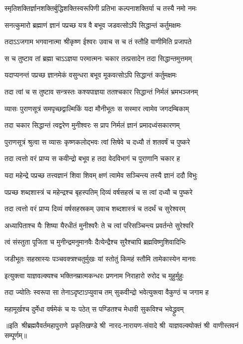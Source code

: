 \twolineshloka
{स्मृतिशक्तिर्ज्ञानशक्तिर्बुद्धिशक्तिस्वरूपिणी}
{प्रतिभा कल्पनाशक्तिर्या च तस्यै नमो नमः}%

\twolineshloka
{सनत्कुमारो ब्रह्माणं ज्ञानं पप्रच्छ यत्र वै}
{बभूव जडवत्सोऽपि सिद्धान्तं कर्तुमक्षमः}%

\twolineshloka
{तदाऽऽजगाम भगवानात्मा श्रीकृष्ण ईश्वरः}
{उवाच स च तं स्तौहि वाणीमिति प्रजापते}%

\twolineshloka
{स च तुष्टाव तां ब्रह्मा चाऽऽज्ञया परमात्मनः}
{चकार तत्प्रसादेन तदा सिद्धान्तमुत्तमम्}%

\twolineshloka
{यदाप्यनन्तं पप्रच्छ ज्ञानमेकं वसुन्धरा}
{बभूव मूकवत्सोऽपि सिद्धान्तं कर्तुमक्षमः}%

\twolineshloka
{तदा त्वां च स तुष्टाव सन्त्रस्तः कश्यपाज्ञया}
{ततश्चकार सिद्धान्तं निर्मलं भ्रमभञ्जनम्}%

\twolineshloka
{व्यासः पुराणसूत्रं समपृच्छद्वाल्मिकिं यदा}
{मौनीभूतः स सस्मार त्वामेव जगदम्बिकाम्}%

\twolineshloka
{तदा चकार सिद्धान्तं त्वद्वरेण मुनीश्वरः}
{स प्राप निर्मलं ज्ञानं प्रमादध्वंसकारणम्}%

\twolineshloka
{पुराणसूत्रं श्रुत्वा स व्यासः कृष्णकलोद्भवः}
{त्वां सिषेवे च दध्यौ तं शतवर्षं च पुष्करे}%

\twolineshloka
{तदा त्वत्तो वरं प्राप्य स कवीन्द्रो बभूव ह}
{तदा वेदविभागं च पुराणानि चकार ह}%

\twolineshloka
{यदा महेन्द्रे पप्रच्छ तत्त्वज्ञानं शिवा शिवम्}
{क्षणं त्वामेव सञ्चिन्त्य तस्यै ज्ञानं ददौ विभुः}%

\twolineshloka
{पप्रच्छ शब्दशास्त्रं च महेन्द्रश्च बृहस्पतिम्}
{दिव्यं वर्षसहस्रं च स त्वां दध्यौ च पुष्करे}%

\twolineshloka
{तदा त्वत्तो वरं प्राप्य दिव्यं वर्षसहस्रकम्}
{उवाच शब्दशास्त्रं च तदर्थं च सुरेश्वरम्}%

\twolineshloka
{अध्यापिताश्च यैः शिष्या यैरधीतं मुनीश्वरैः}
{ते च त्वां परिसञ्चिन्त्य प्रवर्तन्ते सुरेश्वरि}%

\twolineshloka
{त्वं संस्तुता पूजिता च मुनीन्द्रमनुमानवैः}
{दैत्येन्द्रैश्च सुरैश्चापि ब्रह्मविष्णुशिवादिभिः}%

\twolineshloka
{जडीभूतः सहस्रास्यः पञ्चवक्त्रश्चतुर्मुखः}
{यां स्तोतुं किमहं स्तौमि तामेकास्येन मानवः}%

\twolineshloka
{इत्युक्त्वा याज्ञवल्क्यश्च भक्तिनम्रात्मकन्धरः}
{प्रणनाम निराहारो रुरोद च मुहुर्मुहुः}%

\twolineshloka
{तदा ज्योतिः स्वरूपा सा तेनाऽदृष्टाऽप्युवाच तम्}
{सुकवीन्द्रो भवेत्युक्त्वा वैकुण्ठं च जगाम ह}%

\twolineshloka
{महामूर्खश्च दुर्मेधा वर्षमेकं च यः पठेत्}
{स पण्डितश्च मेधावी सुकविश्च भवेद्ध्रुवम्}%

{॥इति~श्रीब्रह्मवैवर्तमहापुराणे~प्रकृतिखण्डे श्री~नारद-नारायण-संवादे श्री~याज्ञवल्क्योक्तं श्री~वाणीस्तवनं सम्पूर्णम्॥}